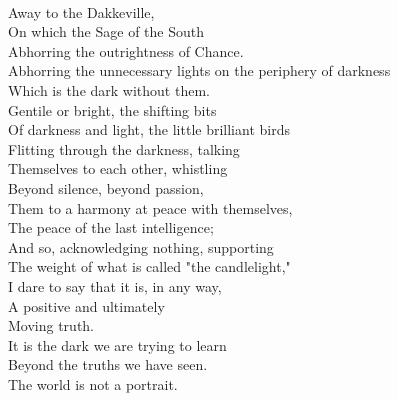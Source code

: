 \documentclass[smalldemyvopaper,11pt,twoside,onecolumn,openright,extrafontsizes]{memoir}
\begin{document}
\\Away to the Dakkeville,
\\On which the Sage of the South
\\Abhorring the outrightness of Chance.
\\Abhorring the unnecessary lights on the periphery of darkness
\\Which is the dark without them.
\\Gentile or bright, the shifting bits
\\Of darkness and light, the little brilliant birds
\\Flitting through the darkness, talking
\\Themselves to each other, whistling
\\Beyond silence, beyond passion,
\\Them to a harmony at peace with themselves,
\\The peace of the last intelligence;
\\And so, acknowledging nothing, supporting
\\The weight of what is called "the candlelight,"
\\I dare to say that it is, in any way,
\\A positive and ultimately
\\Moving truth.
\\It is the dark we are trying to learn
\\Beyond the truths we have seen.
\\The world is not a portrait.
\end{document}
